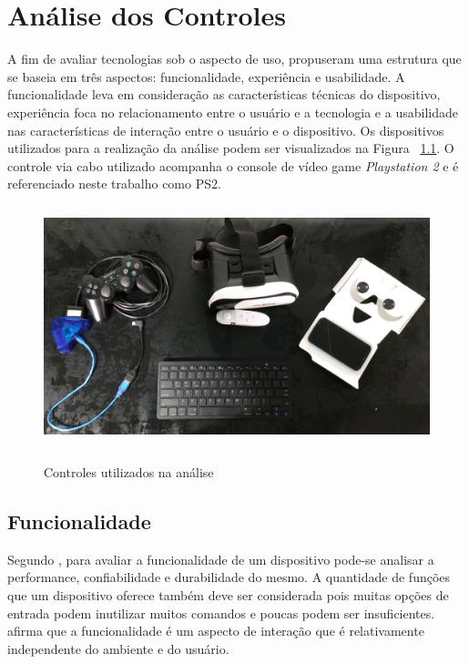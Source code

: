 \chapter{Análise dos Controles}
\label{c.analise}

A fim de avaliar tecnologias sob o aspecto de uso,  propuseram uma estrutura que se baseia em três aspectos: funcionalidade, experiência e usabilidade. A funcionalidade leva em consideração as características técnicas do dispositivo, experiência foca no relacionamento entre o usuário e a tecnologia e a usabilidade nas características de interação entre o usuário e o dispositivo. Os dispositivos utilizados para a realização da análise podem ser visualizados na Figura ~\ref{f.controles}. O controle via cabo utilizado acompanha o console de vídeo game \textit{Playstation 2} e é referenciado neste trabalho como PS2. 

\begin{figure}[H]
	\caption{\small Controles utilizados na análise}
	\centering
	\includegraphics[height=7cm]{Imagens/controles.jpg}
	\label{f.controles}
\end{figure}

\section{Funcionalidade}
\label{funcionalidade}

Segundo , para avaliar a funcionalidade de um dispositivo pode-se analisar a performance, confiabilidade e durabilidade do mesmo. A quantidade de funções que um dispositivo oferece também deve ser considerada pois muitas opções de entrada podem inutilizar muitos comandos e poucas podem ser insuficientes.  afirma que a funcionalidade é um aspecto de interação que é relativamente independente do ambiente e do usuário. 

